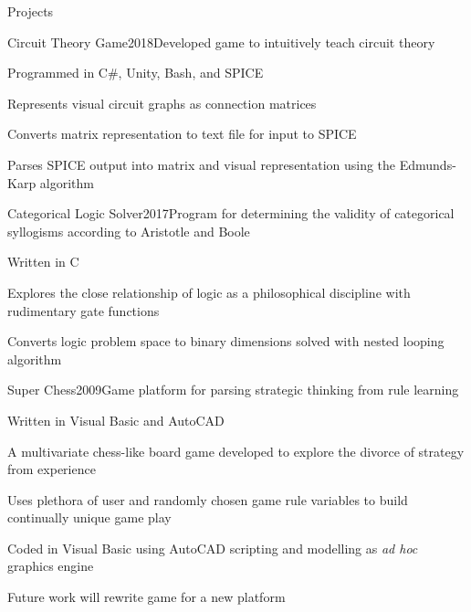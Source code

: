 \documentclass{resume} %
\begin{document}
\iffalse
\begin{rSection}{Projects}


\begin{rWorkSubsection}{Circuit Theory Game}{2018}{Developed game to intuitively teach circuit theory}{}
\item Programmed in C\#, Unity, Bash, and SPICE
\item Represents visual circuit graphs as connection matrices
\item Converts matrix representation to text file for input to SPICE
\item Parses SPICE output into matrix and visual representation using the Edmunds-Karp algorithm
\end{rWorkSubsection}
\iffalse
\begin{rWorkSubsection}{Categorical Logic Solver}{2017}{Program for determining the validity of categorical syllogisms according to Aristotle and Boole}{}
\item Written in C
\item Explores the close relationship of logic as a philosophical discipline with rudimentary gate functions
\item Converts logic problem space to binary dimensions solved with nested looping algorithm
\end{rWorkSubsection}


\begin{rWorkSubsection}{Super Chess}{2009}{Game platform for parsing strategic thinking from rule learning}{}
\item Written in Visual Basic and AutoCAD
\item A multivariate chess-like board game developed to explore the divorce of strategy from experience
\item Uses plethora of user and randomly chosen game rule variables to build continually unique game play
\item Coded in Visual Basic using AutoCAD scripting and modelling as {\em ad hoc} graphics engine
\item Future work will rewrite game for a new platform
\end{rWorkSubsection}


\end{rSection}
\end{document}
